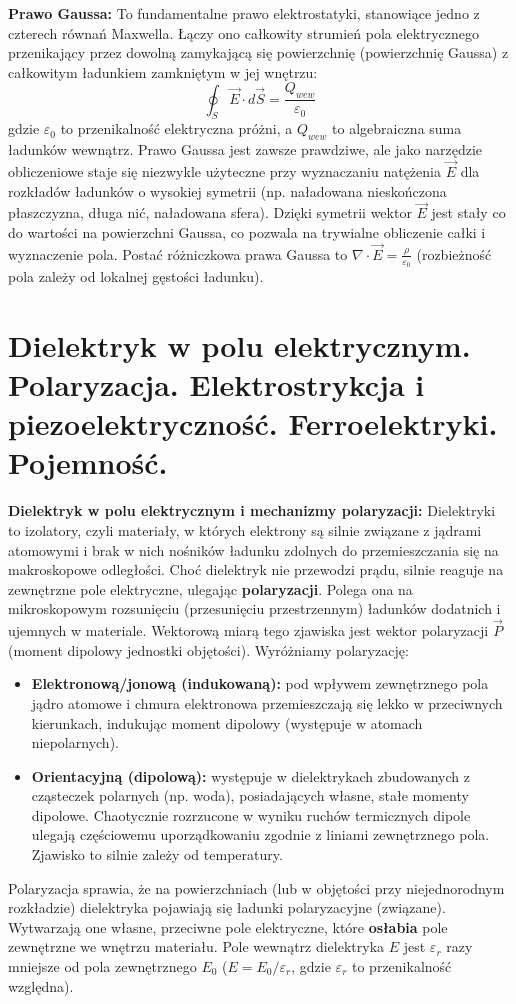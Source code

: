 \documentclass[11pt, a4paper]{article}
\begin{document}
\textbf{Prawo Gaussa:}
To fundamentalne prawo elektrostatyki, stanowiące jedno z czterech równań Maxwella. Łączy ono całkowity strumień pola elektrycznego przenikający przez dowolną zamykającą się powierzchnię (powierzchnię Gaussa) z całkowitym ładunkiem zamkniętym w jej wnętrzu:
\[
\oint_S \vec{E} \cdot d\vec{S} = \frac{Q_{wew}}{\varepsilon_0}
\]
gdzie $\varepsilon_0$ to przenikalność elektryczna próżni, a $Q_{wew}$ to algebraiczna suma ładunków wewnątrz.
Prawo Gaussa jest zawsze prawdziwe, ale jako narzędzie obliczeniowe staje się niezwykle użyteczne przy wyznaczaniu natężenia $\vec{E}$ dla rozkładów ładunków o wysokiej symetrii (np. naładowana nieskończona płaszczyzna, długa nić, naładowana sfera). Dzięki symetrii wektor $\vec{E}$ jest stały co do wartości na powierzchni Gaussa, co pozwala na trywialne obliczenie całki i wyznaczenie pola. Postać różniczkowa prawa Gaussa to $\nabla \cdot \vec{E} = \frac{\rho}{\varepsilon_0}$ (rozbieżność pola zależy od lokalnej gęstości ładunku).

\section{Dielektryk w polu elektrycznym. Polaryzacja. Elektrostrykcja i piezoelektryczność. Ferroelektryki. Pojemność.}

\textbf{Dielektryk w polu elektrycznym i mechanizmy polaryzacji:}
Dielektryki to izolatory, czyli materiały, w których elektrony są silnie związane z jądrami atomowymi i brak w nich nośników ładunku zdolnych do przemieszczania się na makroskopowe odległości. Choć dielektryk nie przewodzi prądu, silnie reaguje na zewnętrzne pole elektryczne, ulegając \textbf{polaryzacji}. Polega ona na mikroskopowym rozsunięciu (przesunięciu przestrzennym) ładunków dodatnich i ujemnych w materiale. Wektorową miarą tego zjawiska jest wektor polaryzacji $\vec{P}$ (moment dipolowy jednostki objętości). Wyróżniamy polaryzację:
\begin{itemize}
    \item \textbf{Elektronową/jonową (indukowaną):} pod wpływem zewnętrznego pola jądro atomowe i chmura elektronowa przemieszczają się lekko w przeciwnych kierunkach, indukując moment dipolowy (występuje w atomach niepolarnych).
    \item \textbf{Orientacyjną (dipolową):} występuje w dielektrykach zbudowanych z cząsteczek polarnych (np. woda), posiadających własne, stałe momenty dipolowe. Chaotycznie rozrzucone w wyniku ruchów termicznych dipole ulegają częściowemu uporządkowaniu zgodnie z liniami zewnętrznego pola. Zjawisko to silnie zależy od temperatury.
\end{itemize}
Polaryzacja sprawia, że na powierzchniach (lub w objętości przy niejednorodnym rozkładzie) dielektryka pojawiają się ładunki polaryzacyjne (związane). Wytwarzają one własne, przeciwne pole elektryczne, które \textbf{osłabia} pole zewnętrzne we wnętrzu materiału. Pole wewnątrz dielektryka $E$ jest $\varepsilon_r$ razy mniejsze od pola zewnętrznego $E_0$ ($E = E_0/\varepsilon_r$, gdzie $\varepsilon_r$ to przenikalność względna).
\end{document}
